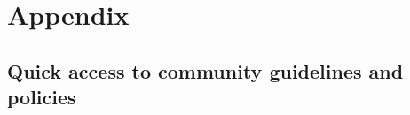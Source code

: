 \documentclass{article}
\begin{document}

	




{}


\section{Appendix}

\subsection{Quick access to community guidelines and policies} \label{links}
\end{document}
